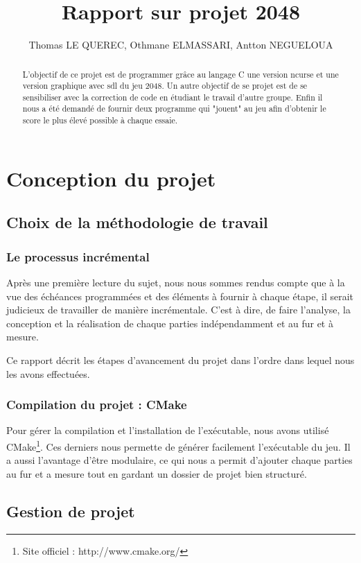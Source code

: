 \documentclass[12pt]{article}
\title{Rapport sur projet 2048}
\author{Thomas LE QUEREC, Othmane ELMASSARI, Antton NEGUELOUA}
\begin{document}
\maketitle

\begin{abstract}
  L'objectif de ce projet est de programmer grâce au langage C une version ncurse et une version graphique avec sdl du jeu 2048.
Un autre objectif de se projet est de se sensibiliser avec la correction de code en étudiant le travail d'autre groupe.
Enfin il nous a été demandé de fournir deux programme qui "jouent" au jeu afin d'obtenir le score le plus élevé possible à chaque essaie.
\end{abstract}

\tableofcontents

\section{Conception du projet}
\subsection{Choix de la méthodologie de travail}
\subsubsection{Le processus incrémental}
Après une première lecture du sujet, nous nous sommes rendus compte que à la vue des échéances programmées et des éléments à fournir à chaque étape, il serait judicieux de travailler de manière incrémentale. C'est à dire, de faire l'analyse, la conception et la réalisation de chaque parties indépendamment et au fur et à mesure.

Ce rapport décrit les étapes d'avancement du projet dans l'ordre dans lequel nous les avons effectuées.
\subsubsection{Compilation du projet : CMake}
Pour gérer la compilation et l'installation de l'exécutable, nous avons utilisé CMake\footnote{Site officiel : http://www.cmake.org/}. Ces derniers nous permette de générer facilement l'exécutable du jeu. 
Il a aussi l'avantage d'être modulaire, ce qui nous a permit d'ajouter chaque parties au fur et a mesure tout en gardant un dossier de projet bien structuré.

\subsection{Gestion de projet}
\end{document}
